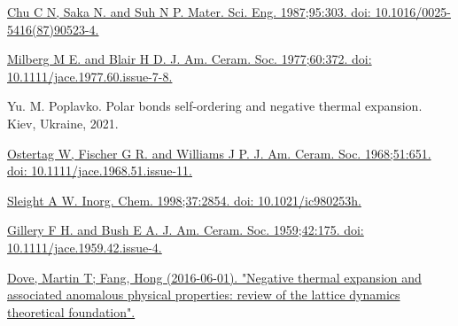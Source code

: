 \documentclass[12pt, a4paper, twocolumn]{article}
\begin{document}
\begin{thebibliography}{9}
 \href{https://scholar.google.com/scholar_lookup?journal=Mater.+Sci.+Eng.&author=C+N+Chu&author=N+Saka&author=N+P+Suh&volume=95&publication_year=1987&pages=303&issn=00255416&doi=10.1016/0025-5416(87)90523-4&}{Chu C N, Saka N. and Suh N P. Mater. Sci. Eng. 1987;95:303. doi: 10.1016/0025-5416(87)90523-4.}  
 
  \href{https://scholar.google.com/scholar_lookup?journal=J.+Am.+Ceram.+Soc.&author=M+E+Milberg&author=H+D+Blair&volume=60&publication_year=1977&pages=372&issn=0002-7820&issn=1551-2916&doi=10.1111/jace.1977.60.issue-7-8&}{Milberg M E. and Blair H D. J. Am. Ceram. Soc. 1977;60:372. doi: 10.1111/jace.1977.60.issue-7-8.}

  Yu. M. Poplavko. Polar bonds self-ordering and negative thermal expansion.  
Kiev, Ukraine, 2021.

  \href{https://scholar.google.com/scholar_lookup?journal=J.+Am.+Ceram.+Soc.&author=W+Ostertag&author=G+R+Fischer&author=J+P+Williams&volume=51&publication_year=1968&pages=651&issn=00027820&issn=15512916&doi=10.1111/jace.1968.51.issue-11&}{Ostertag W, Fischer G R. and Williams J P. J. Am. Ceram. Soc. 1968;51:651. doi: 10.1111/jace.1968.51.issue-11.}

  \href{https://scholar.google.com/scholar_lookup?journal=Inorg.+Chem.&author=A+W+Sleight&volume=37&publication_year=1998&pages=2854&issn=0020-1669&issn=1520-510X&doi=10.1021/ic980253h&}{Sleight A W. Inorg. Chem. 1998;37:2854. doi: 10.1021/ic980253h.}
 
  \href{https://scholar.google.com/scholar_lookup?journal=J.+Am.+Ceram.+Soc.&author=F+H+Gillery&author=E+A+Bush&volume=42&publication_year=1959&pages=175&issn=0002-7820&issn=1551-2916&doi=10.1111/jace.1959.42.issue-4&}{Gillery F H. and Bush E A. J. Am. Ceram. Soc. 1959;42:175. doi: 10.1111/jace.1959.42.issue-4.}

  \href{https://iopscience.iop.org/article/10.1088/0034-4885/79/6/066503}{Dove, Martin T; Fang, Hong (2016-06-01). "Negative thermal expansion and associated anomalous physical properties: review of the lattice dynamics theoretical foundation". }





\end{thebibliography}
\end{document}
